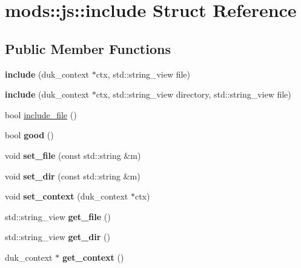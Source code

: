 \hypertarget{structmods_1_1js_1_1include}{}\section{mods\+:\+:js\+:\+:include Struct Reference}
\label{structmods_1_1js_1_1include}
\subsection*{Public Member Functions}
\begin{DoxyCompactItemize}
\item 
\mbox{\label{structmods_1_1js_1_1include_a87dfd9a4118730e0d830c948092cc9d9}} 
{\bfseries include} (duk\+\_\+context $\ast$ctx, std\+::string\+\_\+view file)
\item 
\mbox{\label{structmods_1_1js_1_1include_aa01c9c83000d3bf413b5a7ac07be02bf}} 
{\bfseries include} (duk\+\_\+context $\ast$ctx, std\+::string\+\_\+view directory, std\+::string\+\_\+view file)
\item 
bool \hyperlink{structmods_1_1js_1_1include_afed2b4e711b0b0100f3083921591ba25}{include\+\_\+file} ()
\item 
\mbox{\label{structmods_1_1js_1_1include_a4b76fa14febee7d5684e63e6d5be97dd}} 
bool {\bfseries good} ()
\item 
\mbox{\label{structmods_1_1js_1_1include_a76f5618437277cb381c1e277a34eafde}} 
void {\bfseries set\+\_\+file} (const std\+::string \&m)
\item 
\mbox{\label{structmods_1_1js_1_1include_a2781e848a3a7ed2469ef2615b7c33264}} 
void {\bfseries set\+\_\+dir} (const std\+::string \&m)
\item 
\mbox{\label{structmods_1_1js_1_1include_a05092b4f04476ff0f7d5e2cf1059e324}} 
void {\bfseries set\+\_\+context} (duk\+\_\+context $\ast$ctx)
\item 
\mbox{\label{structmods_1_1js_1_1include_a02dfda8087873c971552f70bf1b551f4}} 
std\+::string\+\_\+view {\bfseries get\+\_\+file} ()
\item 
\mbox{\label{structmods_1_1js_1_1include_a274f97552a8b37900b7ba6fdcb4480ea}} 
std\+::string\+\_\+view {\bfseries get\+\_\+dir} ()
\item 
\mbox{\label{structmods_1_1js_1_1include_ad44dd38a9eb9c78c37d24e4c48162556}} 
duk\+\_\+context $\ast$ {\bfseries get\+\_\+context} ()
\end{DoxyCompactItemize}


